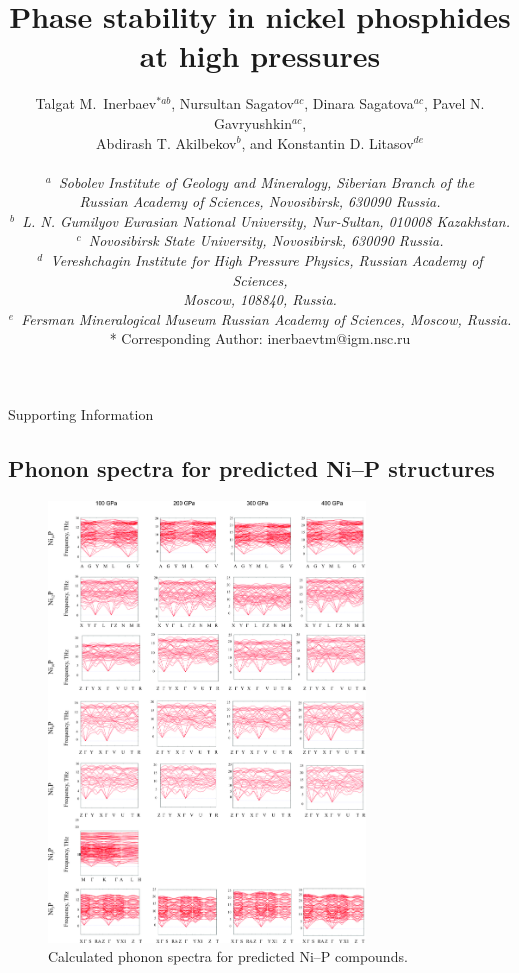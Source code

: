\documentclass[a4paper,10pt]{article}
\title{Phase stability in nickel phosphides at high pressures}
\author{Talgat M.~Inerbaev$^{*ab}$, Nursultan Sagatov$^{ac}$, Dinara Sagatova$^{ac}$, Pavel N.  Gavryushkin$^{ac}$,  \\ 
Abdirash T. Akilbekov$^{b}$, and Konstantin D. Litasov$^{de}$ \\
\vspace{0pt}\\
\textit{$^{a}$~Sobolev Institute of Geology and Mineralogy, Siberian Branch of the }\\
\textit{ Russian Academy of Sciences, Novosibirsk, 630090 Russia.}\\
\textit{$^{b}$~L. N. Gumilyov Eurasian National University, Nur-Sultan, 010008 Kazakhstan.}\\
\textit{$^{c}$~Novosibirsk State University, Novosibirsk, 630090 Russia.}\\
\textit{$^{d}$~Vereshchagin Institute for High Pressure Physics, Russian Academy of Sciences, }\\
\textit{Moscow, 108840, Russia.}\\
\textit{$^{e}$~Fersman Mineralogical Museum Russian Academy of Sciences, Moscow, Russia.}\\
* Corresponding Author: inerbaevtm@igm.nsc.ru
}
\date{}
\begin{document}
\maketitle

{\Large{Supporting Information}}
\newpage
\subsection{Phonon spectra for predicted Ni--P structures}

\begin{figure}[h]
 \centering
 \includegraphics[width=0.75\textwidth]{Phonon-Dispersion.jpg} %
 \caption{Calculated phonon spectra for predicted Ni--P compounds.}
 \label{phonon-disp}
\end{figure}
\end{document}
